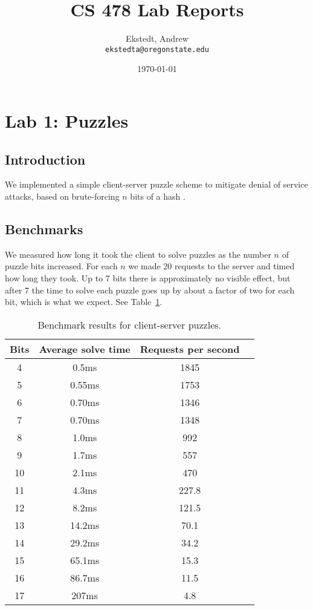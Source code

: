 \documentclass[10pt]{article}
\title{CS 478 Lab Reports}
\author{
Ekstedt, Andrew\\
\texttt{ekstedta@oregonstate.edu}
}
\date{\today}
\begin{document}
\maketitle

\section{Lab 1: Puzzles}
\subsection{Introduction}

We implemented a simple client-server puzzle scheme to mitigate denial of service attacks, based on brute-forcing $n$ bits of a hash \cite{juels}.

\subsection{Benchmarks}

We measured how long it took the client to solve puzzles as the number $n$ of puzzle bits increased. For each $n$ we made 20 requests to the server and timed how long they took. Up to 7 bits there is approximately no visible effect, but after 7 the time to solve each puzzle goes up by about a factor of two for each bit, which is what we expect. See Table~\ref{tab:puzzles}. 

\begin{table}[h]
\centering
\begin{tabular}{cccc}
\hline
Bits & Average solve time & Requests per second \\
\hline
4 & 0.5ms & 1845\\
5 & 0.55ms & 1753\\
6 & 0.70ms & 1346\\
7 & 0.70ms & 1348	\\
8 & 1.0ms & 992\\
9 & 1.7ms& 557 \\
10 & 2.1ms & 470 \\
11 & 4.3ms & 227.8\\
12 & 8.2ms & 121.5\\
13 & 14.2ms & 70.1 \\
14 & 29.2ms & 34.2 \\
15 & 65.1ms & 15.3 \\
16 & 86.7ms & 11.5 \\
17 & 207ms & 4.8 \\
\hline
\end{tabular}
\caption{Benchmark results for client-server puzzles.}
\label{tab:puzzles}
\end{table}
\end{document}
